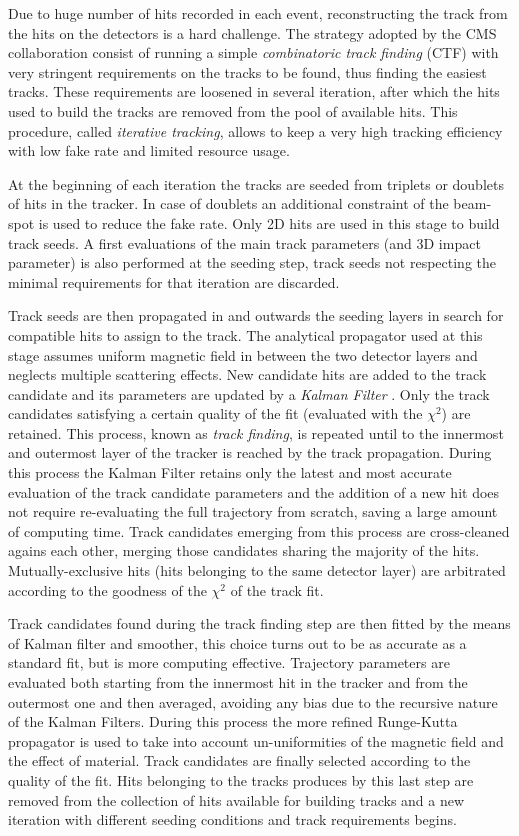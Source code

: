 Due to huge number of hits recorded in each event, reconstructing the track from the hits on the detectors is a hard challenge. The strategy adopted by the CMS collaboration consist of running a simple \emph{combinatoric track finding} (CTF) with very stringent requirements on the tracks to be found, thus finding the easiest tracks. These requirements are loosened in several iteration, after which the hits used to build the tracks are removed from the pool of available hits. This procedure, called \emph{iterative tracking}, allows to keep a very high tracking efficiency with low fake rate and limited resource usage. 

At the beginning of each iteration the tracks are seeded from triplets or doublets of hits in the tracker. In case of doublets an additional constraint of the beam-spot is used to reduce the fake rate. Only 2D hits are used in this stage to build track seeds. A first evaluations of the main track parameters (\pT and 3D impact parameter) is also performed at the seeding step, track seeds not respecting the minimal requirements for that iteration are discarded.

Track seeds are then propagated in and outwards the seeding layers in search for compatible hits to assign to the track. The analytical propagator used at this stage assumes uniform magnetic field in between the two detector layers and neglects multiple scattering effects. New candidate hits are added to the track candidate and its parameters are updated by a \emph{Kalman Filter} \cite{Fruhwirth:1987fm}. Only the track candidates satisfying a certain quality of the fit (evaluated with the $\chi^2$) are retained. This process, known as \emph{track finding}, is repeated until to the innermost and outermost layer of the tracker is reached by the track propagation. During this process the Kalman Filter retains only the latest and most accurate evaluation of the track candidate parameters and the addition of a new hit does not require re-evaluating the full trajectory from scratch, saving a large amount of computing time. Track candidates emerging from this process are cross-cleaned agains each other, merging those candidates sharing the majority of the hits. Mutually-exclusive hits (hits belonging to the same detector layer) are arbitrated according to the goodness of the $\chi^2$ of the track fit.

Track candidates found during the track finding step are then fitted by the means of Kalman filter and smoother, this choice turns out to be as accurate as a standard fit, but is more computing effective. Trajectory parameters are evaluated both starting from the innermost hit in the tracker and from the outermost one and then averaged, avoiding any bias due to the recursive nature of the Kalman Filters. During this process the more refined Runge-Kutta propagator is used to take into account un-uniformities of the magnetic field and the effect of material. Track candidates are finally selected according to the quality of the fit. Hits belonging to the tracks produces by this last step are removed from the collection of hits available for building tracks and a new iteration with different seeding conditions and track requirements begins. 

